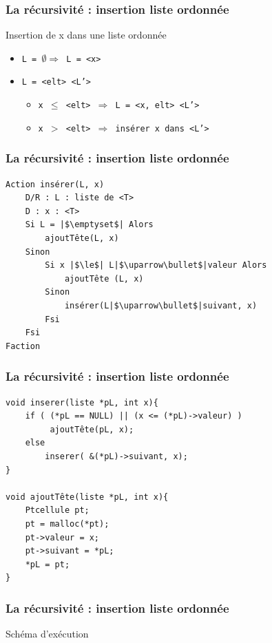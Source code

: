 \documentclass[table,handout,tikz,12pt,svgnames]{beamer}
\begin{document}
\begin{frame}[fragile=singleslide]
	\frametitle{La récursivité : insertion liste ordonnée}
	\begin{block}{Insertion de x dans une liste ordonnée}
		\begin{itemize}
			\item \texttt{L = $\emptyset \Rightarrow$ L = <x>}
			\item \texttt{L = <elt> <L'>}
			\begin{itemize}
				\item \texttt{x $\le$ <elt> $\Rightarrow$ L = <x, elt> <L'>}
				\item \texttt{x $>$ <elt> $\Rightarrow$ insérer x dans <L'>}
			\end{itemize}
		\end{itemize}
	\end{block}
\end{frame}

\begin{frame}[fragile=singleslide]
	\frametitle{La récursivité : insertion liste ordonnée}
	\begin{block}{} %
		\begin{verbatim}
Action insérer(L, x)
	D/R : L : liste de <T>
	D : x : <T>
	Si L = |$\emptyset$| Alors
		ajoutTête(L, x)
	Sinon
		Si x |$\le$| L|$\uparrow\bullet$|valeur Alors
			ajoutTête (L, x)
		Sinon
			insérer(L|$\uparrow\bullet$|suivant, x)
		Fsi
	Fsi
Faction
		\end{verbatim}
	\end{block}
\end{frame}

\begin{frame}[fragile=singleslide]
	\frametitle{La récursivité : insertion liste ordonnée}
	\begin{block}{} %
		\begin{verbatim}
void inserer(liste *pL, int x){
	if ( (*pL == NULL) || (x <= (*pL)->valeur) )
		 ajoutTête(pL, x);
	else
		inserer( &(*pL)->suivant, x);
}

void ajoutTête(liste *pL, int x){
	Ptcellule pt;
	pt = malloc(*pt);
	pt->valeur = x;
	pt->suivant = *pL;
	*pL = pt;
}
		\end{verbatim}
	\end{block}
\end{frame}

\begin{frame}[fragile=singleslide]
	\frametitle{La récursivité : insertion liste ordonnée}
	\vspace{-4cm}
	\begin{block}{Schéma d'exécution}
	\end{block}
\end{frame}


\end{document}
